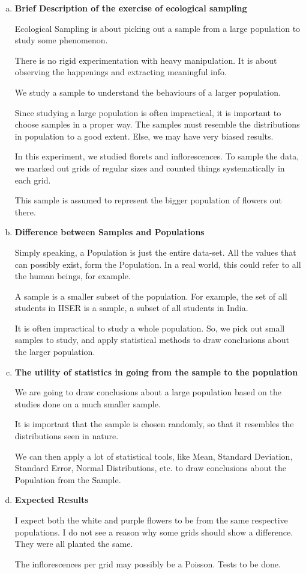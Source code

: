 \documentclass[twocolumn]{article}
\begin{document}
\begin{enumerate}[a)]
\item \textbf{Brief Description of the exercise of ecological sampling} 

Ecological Sampling is about picking out a sample from a large population to study some phenomenon. 

There is no rigid experimentation with heavy manipulation. It is about observing the happenings and extracting meaningful info.

We study a sample to understand the behaviours of a larger population. 

Since studying a large population is often impractical, it is important to choose samples in a proper way. The samples must resemble the distributions in population to a good extent. Else, we may have very biased results.

In this experiment, we studied florets and inflorescences. To sample the data, we marked out grids of regular sizes and counted things systematically in each grid. 

This sample is assumed to represent the bigger population of flowers out there.

\item \textbf{Difference between Samples and Populations}

Simply speaking, a Population is just the entire data-set. All the values that can possibly exist, form the Population. In a real world, this could refer to all the human beings, for example.


A sample is a smaller subset of the population. For example, the set of all students in IISER is a sample, a subset of all students in India.


It is often impractical to study a whole population. So, we pick out small samples to study, and apply statistical methods to draw conclusions about the larger population. 

\item \textbf{The utility of statistics in going from the sample to the population}

We are going to draw conclusions about a large population based on the studies done on a much smaller sample.

It is important that the sample is chosen randomly, so that it resembles the distributions seen in nature. 

We can then apply a lot of statistical tools, like Mean, Standard Deviation, Standard Error, Normal Distributions, etc. to draw conclusions about the Population from the Sample.

\item \textbf{Expected Results}

I expect both the white and purple flowers to be from the same respective populations. I do not see a reason why some grids should show a difference. They were all planted the same.


The inflorescences per grid may possibly be a Poisson. Tests to be done.

\end{enumerate}
\end{document}
